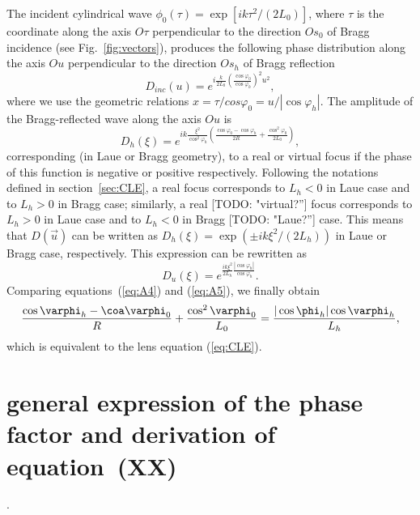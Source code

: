 \documentclass[preprint]{iucr}              %
\newcommand{\todo}[1]{{\color{red}[TODO: "#1'']}}
\begin{document}
The incident cylindrical wave $\phi_0(\tau)=\exp[i k \tau^2 / (2L_0)]$, where $\tau$ is the coordinate along the axis $O\tau$ perpendicular to the direction $Os_0$ of Bragg incidence (see Fig.~\ref{fig:vectors}), produces the following phase distribution along the axis $Ou$ perpendicular to the direction $Os_h$ of Bragg reflection 
\begin{equation}
    D_{inc}(u) = e^{i \frac{k}{2L_0}\left(\frac{\cos\varphi_0}{\cos\varphi_h}\right)^2 u^2},
\end{equation}
where we use the geometric relations $x=\tau/cos\varphi_0=u/|\cos\varphi_h|$. The amplitude of the Bragg-reflected wave along the axis $Ou$ is
\begin{equation}
\label{eq:A4}
    D_h(\xi) = e^{i k
    \frac{\xi^2}{\cos^2\varphi_h}\left(\frac{\cos\varphi_0-\cos\varphi_h}{2R} + \frac{\cos^2\varphi_0}{2L_0}\right)},
\end{equation}
corresponding (in Laue or Bragg geometry), to a real or virtual focus if the phase of this function is negative or positive respectively. Following the notations defined in section~\ref{sec:CLE}, a real focus corresponds to $L_h<0$ in Laue case and to $L_h>0$ in Bragg case; similarly, a real \todo{virtual?} focus corresponds to $L_h>0$ in Laue case and to $L_h<0$ in Bragg \todo{Laue?} case. This means that $D(\vec u)$ can be written as $D_h(\xi) = \exp(\pm i k \xi^2 / (2L_h))$ in Laue or Bragg case, respectively. This expression can be rewritten as
\begin{equation}
\label{eq:A5}
D_u(\xi) = e^{\frac{i k \xi^2}{2 L_h}\frac{|\cos\varphi_h|}{\cos\varphi_h}}.   
\end{equation}
Comparing equations~(\ref{eq:A4}) and (\ref{eq:A5}), we finally obtain
\begin{equation}
    \frac{\cos\varphi_h-\coa\varphi_0}{R}+
    \frac{\cos^2\varphi_0}{L_0}=\frac{|\cos\phi_h|\cos\varphi_h}{L_h},
\end{equation}
which is equivalent to the lens equation (\ref{eq:CLE}).

\section{general expression of the phase factor and derivation of equation~(XX)}
\label{sec:appendix2}.
\end{document}
